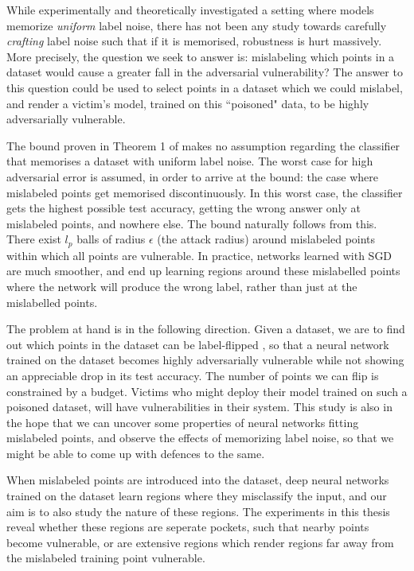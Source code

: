\documentclass{ociamthesis}
\begin{document}
While \citet{sanyal2021how} experimentally and theoretically investigated a
setting where models memorize \emph{uniform} label noise, there has not been any
study towards carefully \emph{crafting} label noise such that if it is
memorised, robustness is hurt massively. More precisely, the question we seek to
answer is: mislabeling which points in a dataset would cause a greater fall in
the adversarial vulnerability? The answer to this question could be used to
select points in a dataset which we could mislabel, and render a victim's model,
trained on this ``poisoned" data, to be highly adversarially vulnerable.

The bound proven in Theorem 1 of \citet{sanyal2021how} makes no assumption
regarding the classifier that memorises a dataset with uniform label noise. The
worst case for high adversarial error is assumed, in order to arrive at the
bound: the case where mislabeled points get memorised discontinuously. In this
worst case, the classifier gets the highest possible test accuracy, getting the
wrong answer only at mislabeled points, and nowhere else. The bound naturally
follows from this. There exist $l_p$ balls of radius $\epsilon$ (the
attack radius) around mislabeled points within which all points are vulnerable.
In practice, networks learned with SGD are much smoother, and end up learning
regions around these mislabelled points where the network will produce the wrong
label, rather than just at the mislabelled points.

The problem at hand is in the following direction. Given a dataset, we are to
find out which points in the dataset can be label-flipped , so that a neural
network trained on the dataset becomes highly adversarially vulnerable while not
showing an appreciable drop in its test accuracy. The number of points we can
flip is constrained by a budget. Victims who might deploy their model trained on
such a poisoned dataset, will have vulnerabilities in their system. This study
is also in the hope that we can uncover some properties of neural networks
fitting mislabeled points, and observe the effects of memorizing label noise, so
that we might be able to come up with defences to the same.

When mislabeled points are introduced into the dataset, deep neural networks
trained on the dataset learn regions where they misclassify the input, and our
aim is to also study the nature of these regions. The experiments in this thesis
reveal whether these regions are seperate pockets, such that nearby points
become vulnerable, or are extensive regions which render regions far away from
the mislabeled training point vulnerable. 
\end{document}
